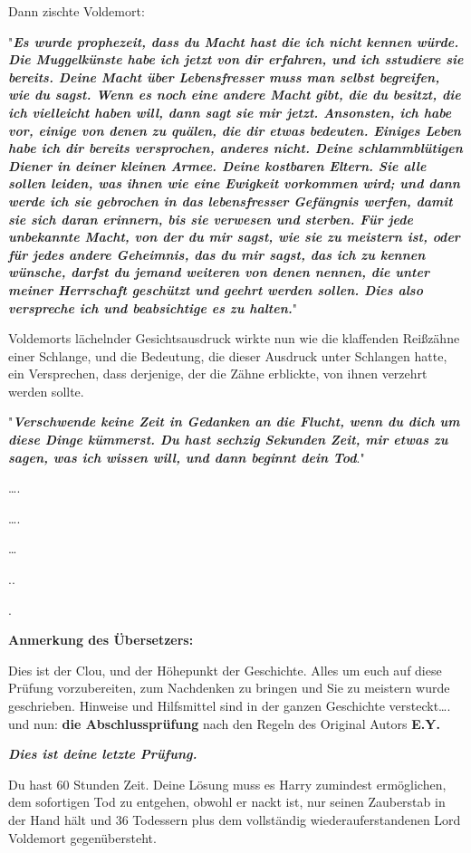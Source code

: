 {Dann zischte Voldemort:

"\textbf{\emph{Es wurde prophezeit, dass du Macht hast die ich nicht kennen würde. Die Muggelkünste habe ich jetzt von dir erfahren, und ich sstudiere sie bereits. Deine Macht über Lebensfresser muss man selbst begreifen, wie du sagst. Wenn es noch eine andere Macht gibt, die du besitzt, die ich vielleicht haben will, dann sagt sie mir jetzt. Ansonsten, ich habe vor, einige von denen zu quälen, die dir etwas bedeuten. Einiges Leben habe ich dir bereits versprochen, anderes nicht. Deine schlammblütigen Diener in deiner kleinen Armee. Deine kostbaren Eltern. Sie alle sollen leiden, was ihnen wie eine Ewigkeit vorkommen wird; und dann werde ich sie gebrochen in das lebensfresser Gefängnis werfen, damit sie sich daran erinnern, bis sie verwesen und sterben. Für jede unbekannte Macht, von der du mir sagst, wie sie zu meistern ist, oder für jedes andere Geheimnis, das du mir sagst, das ich zu kennen wünsche, darfst du jemand weiteren von denen nennen, die unter meiner Herrschaft geschützt und geehrt werden sollen. Dies also verspreche ich und beabsichtige es zu halten.}}"

Voldemorts lächelnder Gesichtsausdruck wirkte nun wie die klaffenden Reißzähne einer Schlange, und die Bedeutung, die dieser Ausdruck unter Schlangen hatte, ein Versprechen, dass derjenige, der die Zähne erblickte, von ihnen verzehrt werden sollte.

"\textbf{\emph{Verschwende keine Zeit in Gedanken an die Flucht, wenn du dich um diese Dinge kümmerst. Du hast sechzig Sekunden Zeit, mir etwas zu sagen, was ich wissen will, und dann beginnt dein Tod}}."

….

….

…

..

.

\textbf{Anmerkung des Übersetzers:}

Dies ist der Clou, und der Höhepunkt der Geschichte. Alles um euch auf diese Prüfung vorzubereiten, zum Nachdenken zu bringen und Sie zu meistern wurde geschrieben. Hinweise und Hilfsmittel sind in der ganzen Geschichte versteckt…. und nun: \textbf{die Abschlussprüfung} nach den Regeln des Original Autors \textbf{E.Y.}

\emph{\hfill\break \textbf{Dies ist deine letzte Prüfung.}}

Du hast 60 Stunden Zeit. Deine Lösung muss es Harry zumindest ermöglichen, dem sofortigen Tod zu entgehen, obwohl er nackt ist, nur seinen Zauberstab in der Hand hält und 36 Todessern plus dem vollständig wiederauferstandenen Lord Voldemort gegenübersteht.

}
